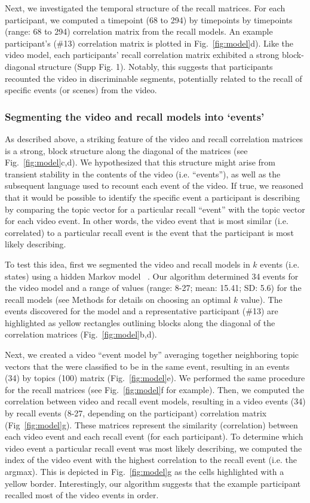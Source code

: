 \documentclass{article}
\begin{document}
{Next, we investigated the temporal structure of the recall matrices. For each participant, we computed a timepoint (68 to 294) by timepoints by timepoints (range: 68 to 294) correlation matrix from the recall models. An example participant's (\#13) correlation matrix is plotted in Fig.~\ref{fig:model}d). Like the video model, each participants' recall correlation matrix exhibited a strong block-diagonal structure (Supp Fig. 1). Notably, this suggests that participants recounted the video in discriminable segments, potentially related to the recall of specific events (or scenes) from the video.

\subsubsection{Segmenting the video and recall models into `events'}
As described above, a striking feature of the video and recall correlation matrices is a strong, block structure along the diagonal of the matrices (see Fig.~\ref{fig:model}c,d).  We hypothesized that this structure might arise from transient stability in the contents of the video (i.e. ``events''), as well as the subsequent language used to recount each event of the video. If true, we reasoned that it would be possible to identify the specific event a participant is describing by comparing the topic vector for a particular recall ``event'' with the topic vector for each video event. In other words, the video event that is most similar (i.e. correlated) to a particular recall event is the event that the participant is most likely describing.

To test this idea, first we segmented the video and recall models in $k$ events (i.e. states) using a hidden Markov model ~\citep{BaldEtal17}. Our algorithm determined 34 events for the video model and a range of values (range: 8-27; mean: 15.41; SD: 5.6) for the recall models (see Methods for details on choosing an optimal $k$ value).  The events discovered for the model and a representative participant (\#13) are highlighted as yellow rectangles outlining blocks along the diagonal of the correlation matrices (Fig.~\ref{fig:model}b,d).

Next, we created a video ``event model by'' averaging together neighboring topic vectors that the were classified to be in the same event, resulting in an events (34) by topics (100) matrix (Fig.~\ref{fig:model}e).  We performed the same procedure for the recall matrices (see Fig.~\ref{fig:model}f for example). Then, we computed the correlation between video and recall event models, resulting in a video events (34) by recall events (8-27, depending on the participant) correlation matrix (Fig~\ref{fig:model}g). These matrices represent the similarity (correlation) between each video event and each recall event (for each participant). To determine which video event a particular recall event was most likely describing, we computed the index of the video event with the highest correlation to the recall event (i.e. the argmax).  This is depicted in Fig.~\ref{fig:model}g as the cells highlighted with a yellow border. Interestingly, our algorithm suggests that the example participant recalled most of the video events in order.

}
\end{document}
